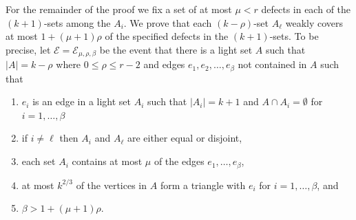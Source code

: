 \documentclass[11pt]{article}
\theoremstyle{definition}
\theoremstyle{remark}
\newcommand{\cE}{\mathcal{E}}
\begin{document}
For the remainder of the proof we
fix a set of at most $ \mu<r$ defects in each of the $ (k+1)$-sets among the $A_i$. 
We prove that each $(k-\rho)$-set $ A_\ell$  weakly covers at most $ 1 + (\mu+1) \rho$ of the specified 
defects in the $ (k+1)$-sets. To
be precise, let $\cE = \cE_{\mu, \rho, \beta}$ be the event that there is
a light set $ A$ such that $ |A| = k - \rho$ where $ 0 \le \rho \le r-2$ 
and edges $e_1, e_2, \dots, e_\beta$ not contained in $A$ such that
\begin{enumerate}
\item $e_i$ is an edge in a light set $A_i$ such that $ |A_i| =k+1$ and $A \cap A_i = \emptyset $ for $i=1,\dots, \beta$
\item if $i \neq \ell$ then $ A_i $ and $ A_\ell$ are either equal or disjoint, 
\item \label{it:at-most-mu} each set $A_i$ contains at most $ \mu$ of the edges $ e_1, \dots, e_\beta$,
\item at most $ k^{2/3}$ of the vertices in $A$ form a triangle with $e_i$ for $i =1, \dots , \beta$,  and
\item \label{it:beta-LB} $\beta > 1 + (\mu+1) \rho$.
\end{enumerate}
\end{document}
